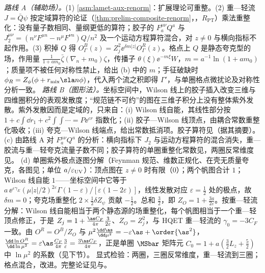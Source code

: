 \begin{proofsketch}
\emph{路线 A（辅助场\cite{Ji:2017oey,Green:2017xeu}）。}(1) \cref{asm:lamet-aux-renorm}：扩展理论可重整。(2) 重—轻流 $J=\bar Q\psi$ 按定域算符的论证（\cref{thm:prelim-composite-renorm}，\tagR，$R_{\mathrm{PT}}$）乘法重整化：没有量子数相同、量纲更低的算符；胶子的 $F^{\mu\nu}_aQ^a$ 与 $J_2^{\mu\nu}=(n^\nu F^{\mu n}-n^\mu F^{\nu n})Q/n^2$ 及一个运动方程算符混合\cite{Dorn:1986dt}，对 $z\neq0$ 与横向指标不起作用。(3) 积掉 $Q$ 得 $O^B_\Gamma(z)=Z_j^2\ee^{\delta m|z|}O^R_\Gamma(z)$。格点上 $Q$ 是静态夸克型的场，作用量 $\frac1{1+am_0}\bar\zeta(\nabla_n+m_0)\zeta$，传播子 $\theta(\xi)\ee^{-m\xi}W$，$m=a^{-1}\ln(1+am_0)$；质量项不被任何对称性禁止，给出 (b) 中的 $m$；手征破缺时 $\phi_R=Z_\phi(\phi+r_{\rm mix}\sla n\phi)$，代入两个流之积即得 $\Gamma'$\cite{Green:2017xeu}，与单圈格点微扰论\cite{Constantinou:2017sej}及对称性分析\cite{Chen:2017mie}一致。
\emph{路线 B（图形法\cite{Ishikawa:2017faj}）。}坐标空间中，Wilson 线上的胶子插入改变三维与四维圈积分的表观发散度；“规范链不可约”的图在三维子积分上没有整体紫外发散。紫外发散因而是定域的，只来自：(i) Wilson 线自能，其线性部分按 $1+c\int\dd r_1+c^2\int\!\!\int\cdots=P\ee^{cr}$ 指数化；(ii) 胶子—Wilson 线顶点，由耦合常数重整化吸收\cite{Dotsenko:1979wb}；(iii) 夸克—Wilson 线端点，给出常数抵消项。胶子算符见\cite{Li:2018tpe,Zhang:2018diq}（据其摘要）。
(c) 由路线 A 对 $F^{\mu\nu}_aQ^a$ 的分析：横向指标下 $J_2$ 与运动方程算符的混合消失，重—胶流与重—轻夸克流量子数不同\cite{JiEtAl2021,Zhang:2018diq}；胶子算符的单圈重整化常数见\cite[第~III.A~节]{JiEtAl2021}，两圈反常维度见\cite{Braun:2020ymy}。
(d) 单圈紫外极点逐图分解（Feynman 规范、维数正规化、在壳无质量夸克，各图见\cite[第~III~节]{IzubuchiEtAl2018}；单位 $a/\varepsilon_{\rm UV}$）：顶点图在 $z\neq0$ 时有限（$0$）；两个帆图合计 $1$；Wilson 线自能 $1$——坐标空间中它等于 $a\,\ee^{\varepsilon\gamma_E}(\mu|z|/2)^{2\varepsilon}\Gamma(1-\varepsilon)/[\varepsilon(1-2\varepsilon)]$，线性发散对应 $\varepsilon=\frac12$ 处的极点，故 $\delta m=0$；夸克场重整化 $2\times\frac12\delta Z_\psi$ 贡献 $-\frac12$。总和 $\frac32$，即 $Z_O=1+\frac{3a}{2\varepsilon}$。按重—轻流分解：Wilson 线自能相当于两个静态源的场重整化，每个帆图相当于一个重—轻顶点修正，于是 $Z_j=1+\frac{\as C_F}{4\pi}\frac3{2\varepsilon}$、$Z_O=Z_j^2$，与 HQET 重—轻流的 $\gamma_0=-3C_F$ 一致。由 $O^R=O^B/Z_O$ 与 $\mu^2\frac{\dd\as}{\dd\mu^2}=-\varepsilon\as+\order{\as^2}$，$\frac{\dd\ln O^R}{\dd\ln\mu^2}=\varepsilon\as\frac{C_F}{4\pi}\frac3\varepsilon=\frac{3\as C_F}{4\pi}$，正是单圈 $\MSbar$ 矩阵元 $C_0=1+a(\frac32L_z+\frac52)$ 中 $\ln\mu^2$ 的系数（见下节）。
显式检验：两圈\cite{Ji:2015jwa}，三圈反常维度\cite{Braun:2020ymy}，重—轻流到三圈\cite{Chetyrkin:2003vi}；格点混合\cite{Constantinou:2017sej,Chen:2017mie}，改进\cite{Green:2020xco}。完整论证见\cite{Ji:2017oey,Ishikawa:2017faj}与\cite[第~III.A~节]{JiEtAl2021}。
\end{proofsketch}

